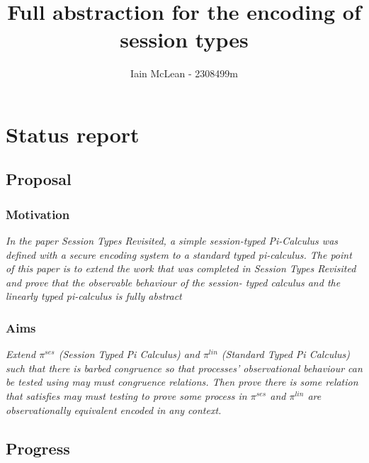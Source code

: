 \documentclass[11pt]{article}
\title{Full abstraction for the encoding of session types}
\author{Iain McLean - 2308499m}
\begin{document}
    \maketitle
    
    
     

\section{Status report}

\subsection{Proposal}\label{proposal}

\subsubsection{Motivation}\label{motivation}

\emph{In the paper Session Types Revisited, a simple session-typed Pi-Calculus was defined with a secure encoding system to a standard typed pi-calculus. The point of this paper is to extend the work that was completed in Session Types Revisited and prove that the observable behaviour of the session-
typed calculus and the linearly typed pi-calculus is fully abstract}

\subsubsection{Aims}\label{aims}

\emph{Extend $\pi^{ses}$ (Session Typed Pi Calculus) and $\pi^{lin}$ (Standard Typed Pi Calculus) such that there is barbed congruence so that processes' observational behaviour can be tested using may must congruence relations. Then prove there is some relation that satisfies may must testing to prove some process in $\pi^{ses}$ and $\pi^{lin}$ are observationally equivalent encoded in any context.}

\subsection{Progress}\label{progress}
\end{document}
